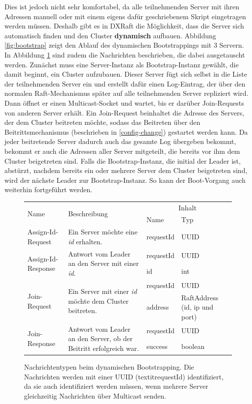 Dies ist jedoch nicht sehr komfortabel, da alle teilnehmenden Server mit ihren Adressen manuell oder mit einem eigens dafür geschriebenem Skript eingetragen werden müssen. Deshalb gibt es in DXRaft die Möglichkeit, dass die Server sich automatisch finden und den Cluster \textbf{dynamisch} aufbauen. Abbildung \ref{fig:bootstrap} zeigt den Ablauf des dynamischen Bootstrappings mit 3 Servern. In Abbildung \ref{fig:bootstrap-messages} sind zudem die Nachrichten beschrieben, die dabei ausgetauscht werden. Zunächst muss eine Server-Instanz als Bootstrap-Instanz gewählt, die damit beginnt, ein Cluster aufzubauen. Dieser Server fügt sich selbst in die Liste der teilnehmenden Server ein und erstellt dafür einen Log-Eintrag, der über den normalen Raft-Mechanismus später auf alle teilnehmenden Server repliziert wird. Dann öffnet er einen Multicast-Socket und wartet, bis er darüber Join-Requests von anderen Server erhält. Ein Join-Request beinhaltet die Adresse des Servers, der dem Cluster beitreten möchte, sodass das Beitreten über den Beitrittsmechanismus (beschrieben in \ref{config-change}) gestartet werden kann. Da jeder beitretende Server dadurch auch das gesamte Log übergeben bekommt, bekommt er auch die Adressen aller Server mitgeteilt, die bereits vor ihm dem Cluster beigetreten sind. Falls die Bootstrap-Instanz, die initial der Leader ist, abstürzt, nachdem bereits ein oder mehrere Server dem Cluster beigetreten sind, wird der nächste Leader zur Bootstrap-Instanz. So kann der Boot-Vorgang auch weiterhin fortgeführt werden.

\begin{figure}[h]
	\footnotesize
	\begin{tabular}{ | l | l | l | l |}	
		\hline
		\multirow{2}{*}{Name} & \multirow{2}{*}{Beschreibung} & \multicolumn{2}{|c|}{Inhalt}  \\ \cline{3-4}
		& & Name & Typ \\ \hline
		Assign-Id-Request & Ein Server möchte eine \textit{id} erhalten. 
		& requestId & UUID \\ \hline
		\multirow{2}{*}{Assign-Id-Response} &  \multirow{2}{0.35\textwidth}{Antwort vom Leader an den Server mit einer \textit{id}.} 
		& requestId & UUID \\
		& & id & int \\ \hline
		\multirow{2}{*}{Join-Request} &  \multirow{2}{0.35\textwidth}{Ein Server mit einer \textit{id} möchte dem Cluster beitreten.} 
		& requestId & UUID \\
		& & address & RaftAddress (id, ip und port)\\ \hline
		\multirow{2}{*}{Join-Response} &  \multirow{2}{0.35\textwidth}{Antwort vom Leader an den Server, ob der Beitritt erfolgreich war.} & requestId & UUID\\
		& & success & boolean \\ \hline
	\end{tabular}
	\caption{Nachrichtentypen beim dynamischen Bootstrapping. Die Nachrichten werden mit einer UUID (textit{requestId}) identifiziert, da sie auch identifiziert werden müssen, wenn mehrere Server gleichzeitig Nachrichten über Multicast senden.}
	\label{fig:bootstrap-messages}
\end{figure}

